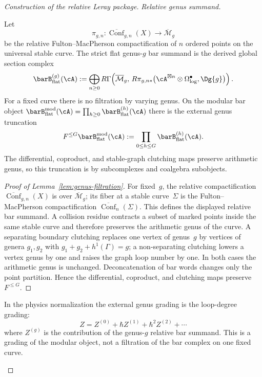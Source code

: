 \begin{proof}[Construction of the relative Leray package]

\emph{Relative genus summand.}

\begin{lemma}
\label{lem:genus-filtration}
Let
\[
\pi_{g,n}\colon \overline{\operatorname{Conf}}_{g,n}(X)
\longrightarrow \overline{\mathcal{M}}_g
\]
be the relative Fulton--MacPherson compactification of $n$ ordered
points on the universal stable curve. The strict flat genus-$g$ bar
summand is the derived global section complex
\[
\barB^{(g)}_{\mathrm{flat}}(\cA)
:=
\bigoplus_{n\geq0}
R\Gamma\!\left(
\overline{\mathcal{M}}_g,\,
R\pi_{g,n*}\bigl(\cA^{\boxtimes n}\otimes\Omega^\bullet_{\log},
\Dg{g}\bigr)\right).
\]
For a fixed curve there is no filtration by varying genus. On the
modular bar object
$\barB^{\mathrm{mod}}_{\mathrm{flat}}(\cA)
=\prod_{h\geq0}\barB^{(h)}_{\mathrm{flat}}(\cA)$ there is the
external genus truncation
\[
F^{\leq G}\barB^{\mathrm{mod}}_{\mathrm{flat}}(\cA)
:=
\prod_{0\leq h\leq G}\barB^{(h)}_{\mathrm{flat}}(\cA).
\]
The differential, coproduct, and stable-graph clutching maps preserve
arithmetic genus, so this truncation is by subcomplexes and coalgebra
subobjects.
\end{lemma}

\begin{proof}[Proof of Lemma~\ref{lem:genus-filtration}]
For fixed~$g$, the relative compactification
$\overline{\operatorname{Conf}}_{g,n}(X)$ is over
$\overline{\mathcal{M}}_g$; its fiber at a stable curve~$\Sigma$ is
the Fulton--MacPherson compactification
$\overline{\operatorname{Conf}}_{n}(\Sigma)$. This defines the displayed relative
bar summand. A collision residue contracts a subset of marked points
inside the same stable curve and therefore preserves the arithmetic
genus of the curve. A separating boundary clutching replaces one
vertex of genus~$g$ by vertices of genera $g_1,g_2$ with
$g_1+g_2+h^1(\Gamma)=g$; a non-separating clutching lowers a vertex
genus by one and raises the graph loop number by one. In both cases
the arithmetic genus is unchanged. Deconcatenation of bar words
changes only the point partition. Hence the differential, coproduct,
and clutching maps preserve $F^{\leq G}$.
\end{proof}

\begin{remark}
In the physics normalization the external genus grading is the
loop-degree grading:
\begin{equation}
Z = Z^{(0)} + \hbar Z^{(1)} + \hbar^2 Z^{(2)} + \cdots
\end{equation}
where $Z^{(g)}$ is the contribution of the genus-$g$ relative bar
summand. This is a grading of the modular object, not a filtration of
the bar complex on one fixed curve.
\end{remark}


\end{proof}
